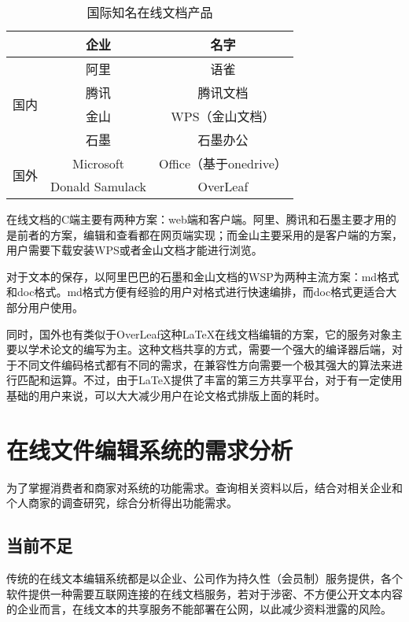 \documentclass[forprint]{software}
\begin{document}
\begin{table}[!htbp]
	\centering
	\caption{国际知名在线文档产品}
	\label{tab:1}
	\begin{tabular}{ccc}
		\hline
		& 企业              & 名字                 \\ \hline
		\multirow{4}{*}{国内} & 阿里              & 语雀                 \\
		& 腾讯              & 腾讯文档               \\
		& 金山              & WPS（金山文档）          \\
		& 石墨              & 石墨办公               \\
		\multirow{2}{*}{国外} & Microsoft       & Office（基于onedrive） \\
		& Donald Samulack & OverLeaf           \\ \hline
	\end{tabular}
\end{table}

在线文档的C端主要有两种方案：web端和客户端。阿里、腾讯和石墨主要才用的是前者的方案，编辑和查看都在网页端实现；而金山主要采用的是客户端的方案，用户需要下载安装WPS或者金山文档才能进行浏览。

对于文本的保存，以阿里巴巴的石墨和金山文档的WSP为两种主流方案：md格式和doc格式。md格式方便有经验的用户对格式进行快速编排，而doc格式更适合大部分用户使用。

同时，国外也有类似于OverLeaf这种LaTeX在线文档编辑的方案，它的服务对象主要以学术论文的编写为主。这种文档共享的方式，需要一个强大的编译器后端，对于不同文件编码格式都有不同的需求，在兼容性方向需要一个极其强大的算法来进行匹配和运算。不过，由于LaTeX提供了丰富的第三方共享平台，对于有一定使用基础的用户来说，可以大大减少用户在论文格式排版上面的耗时。

\chapter{在线文件编辑系统的需求分析}

为了掌握消费者和商家对系统的功能需求。查询相关资料以后，结合对相关企业和个人商家的调查研究，综合分析得出功能需求。

\section{当前不足}

传统的在线文本编辑系统都是以企业、公司作为持久性（会员制）服务提供，各个软件提供一种需要互联网连接的在线文档服务，若对于涉密、不方便公开文本内容的企业而言，在线文本的共享服务不能部署在公网，以此减少资料泄露的风险。
\end{document}
